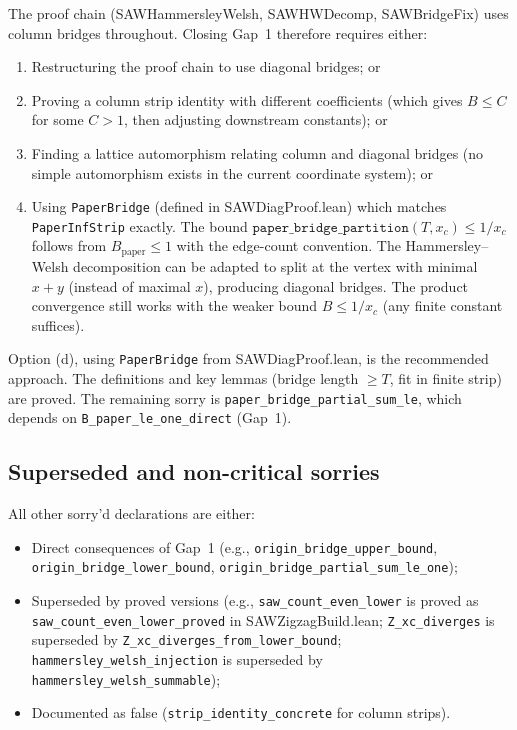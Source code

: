 The proof chain (SAWHammersleyWelsh, SAWHWDecomp, SAWBridgeFix) uses
column bridges throughout. Closing Gap~1 therefore requires either:
\begin{enumerate}
  \item[(a)] Restructuring the proof chain to use diagonal bridges; or
  \item[(b)] Proving a column strip identity with different coefficients
    (which gives $B \leq C$ for some $C > 1$, then adjusting downstream
    constants); or
  \item[(c)] Finding a lattice automorphism relating column and diagonal
    bridges (no simple automorphism exists in the current coordinate system);
    or
  \item[(d)] Using \texttt{PaperBridge} (defined in SAWDiagProof.lean) which
    matches \texttt{PaperInfStrip} exactly. The bound
    $\texttt{paper\_bridge\_partition}(T, x_c) \leq 1/x_c$ follows from
    $B_{\text{paper}} \leq 1$ with the edge-count convention.
    The Hammersley--Welsh decomposition can be adapted to split at
    the vertex with minimal $x+y$ (instead of maximal $x$), producing
    diagonal bridges. The product convergence still works with the
    weaker bound $B \leq 1/x_c$ (any finite constant suffices).
\end{enumerate}

Option (d), using \texttt{PaperBridge} from SAWDiagProof.lean, is the
recommended approach. The definitions and key lemmas (bridge length $\geq T$,
fit in finite strip) are proved. The remaining sorry is
\texttt{paper\_bridge\_partial\_sum\_le}, which depends on
\texttt{B\_paper\_le\_one\_direct} (Gap~1).

\subsection{Superseded and non-critical sorries}

All other sorry'd declarations are either:
\begin{itemize}
  \item Direct consequences of Gap~1 (e.g., \texttt{origin\_bridge\_upper\_bound},
    \texttt{origin\_bridge\_lower\_bound}, \texttt{origin\_bridge\_partial\_sum\_le\_one});
  \item Superseded by proved versions (e.g., \texttt{saw\_count\_even\_lower} is
    proved as \texttt{saw\_count\_even\_lower\_proved} in SAWZigzagBuild.lean;
    \texttt{Z\_xc\_diverges} is superseded by \texttt{Z\_xc\_diverges\_from\_lower\_bound};
    \texttt{hammersley\_welsh\_injection} is superseded by \texttt{hammersley\_welsh\_summable});
  \item Documented as false (\texttt{strip\_identity\_concrete} for column strips).
\end{itemize}

